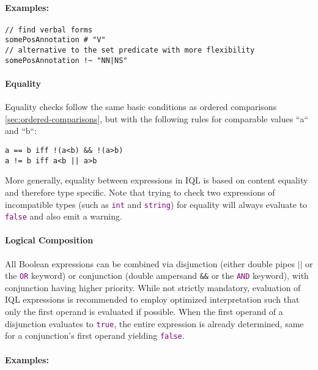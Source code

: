 \documentclass[11pt]{article}
\newcommand{\iql}{IQL\xspace}
\newcommand{\keyword}[1]{\textcolor{purple}{\texttt{#1}}}
\begin{document}
\paragraph{Examples:}

\begin{verbatim}
// find verbal forms
somePosAnnotation # "V"       
// alternative to the set predicate with more flexibility
somePosAnnotation !~ "NN|NS"   
\end{verbatim}

\paragraph{Equality}
\label{sec:equality}

Equality checks follow the same basic conditions as ordered comparisons \cref{sec:ordered-comparisons}, but with the following rules for comparable values ``a`` and ``b``:

\begin{verbatim}
a == b iff !(a<b) && !(a>b)
a != b iff a<b || a>b
\end{verbatim}

\noindent More generally, equality between expressions in \iql is based on content equality and therefore type specific.
Note that trying to check two expressions of incompatible types (such as \keyword{int} and \keyword{string}) for equality will always evaluate to \keyword{false} and also emit a warning. 

\paragraph{Logical Composition}
\label{sec:logical-composition}

All Boolean expressions can be combined via disjunction (either double pipes \texttt{$||$} or the \keyword{OR} keyword) or conjunction (double ampersand \texttt{\&\&} or the \keyword{AND} keyword), with conjunction having higher priority. While not strictly mandatory, evaluation of \iql expressions is recommended to employ optimized interpretation such that only the first operand is evaluated if possible. When the first operand of a disjunction evaluates to \keyword{true}, the entire expression is already determined, same for a conjunction's first operand yielding \keyword{false}. 

\paragraph{Examples:}
\end{document}
